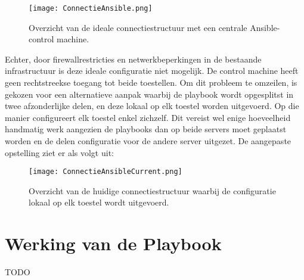 \begin{figure}[H]
    \centering
    \texttt{[image: ConnectieAnsible.png]}
    \caption[Overzicht connectie ideaal]{\label{fig:ansibleconnectie}Overzicht van de ideale connectiestructuur met een centrale Ansible-control machine.}
\end{figure}

Echter, door firewallrestricties en netwerkbeperkingen in de bestaande infrastructuur is deze ideale configuratie niet mogelijk. De control machine heeft geen rechtstreekse toegang tot beide toestellen. 
Om dit probleem te omzeilen, is gekozen voor een alternatieve aanpak waarbij de playbook wordt opgesplitst in twee afzonderlijke delen, en deze lokaal op elk toestel worden uitgevoerd. 
Op die manier configureert elk toestel enkel zichzelf. Dit vereist wel enige hoeveelheid handmatig werk aangezien de playbooks dan op beide servers moet geplaatst worden en de delen configuratie voor de andere server uitgezet.
De aangepaste opstelling ziet er als volgt uit:

\begin{figure}[H]
    \centering
    \texttt{[image: ConnectieAnsibleCurrent.png]}
    \caption[Overzicht connectie huidig]{\label{fig:ansibleconnectiehuidig}Overzicht van de huidige connectiestructuur waarbij de configuratie lokaal op elk toestel wordt uitgevoerd.}
\end{figure}

\section{Werking van de Playbook}
\label{sec:playbookwerking}

TODO
